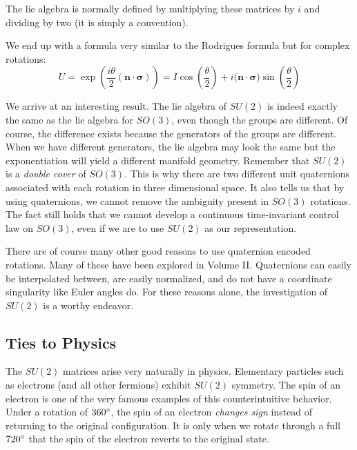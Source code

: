The \gls{lie algebra} is normally defined by multiplying these matrices by $i$ and dividing by two (it is simply a convention).





We end up with a formula very similar to the Rodrigues formula but for complex rotations:
$$U=\exp\left(\frac{i\theta}{2}(\bm{n}\cdot\bm{\sigma})\right)=I\cos\left(\frac{\theta}{2}\right)+i(\bm{n}\cdot\bm{\sigma)}\sin\left(\frac{\theta}{2}\right)$$

We arrive at an interesting result. The \gls{lie algebra} of $SU(2)$ is indeed exactly the same as the \gls{lie algebra} for $SO(3)$, even though the groups are different. Of course, the difference exists because the generators of the groups are different. When we have different generators, the \gls{lie algebra} may look the same but the exponentiation will yield a different manifold geometry. Remember that $SU(2)$ is a \textit{double cover} of $SO(3)$. This is why there are two different unit quaternions associated with each rotation in three dimensional space. It also tells us that by using quaternions, we cannot remove the ambiguity present in $SO(3)$ rotations. The fact still holds that we cannot develop a continuous time-invariant control law on $SO(3)$, even if we are to use $SU(2)$ as our representation. 

There are of course many other good reasons to use quaternion encoded rotations. Many of these have been explored in Volume II. Quaternions can easily be interpolated between, are easily normalized, and do not have a coordinate singularity like Euler angles do. For these reasons alone, the investigation of $SU(2)$ is a worthy endeavor.

\subsection{Ties to Physics}

The $SU(2)$ matrices arise very naturally in physics. Elementary particles such as electrons (and all other fermions) exhibit $SU(2)$ symmetry. The spin of an electron is one of the very famous examples of this counterintuitive behavior. Under a rotation of $360\degree$, the spin of an electron \textit{changes sign} instead of returning to the original configuration. It is only when we rotate through a full $720\degree$ that the spin of the electron reverts to the original state.


